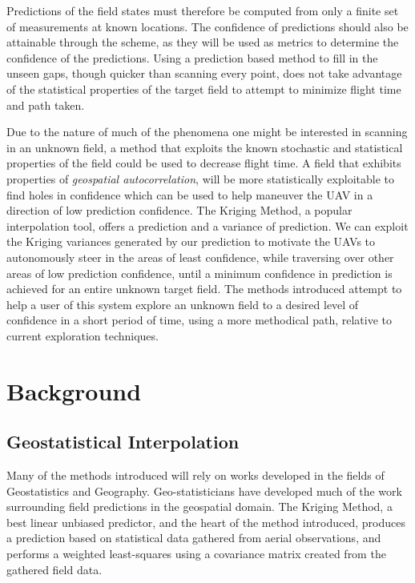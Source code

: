 \documentclass[11pt]{ucthesis}
\begin{document}
Predictions of the field states must therefore be computed from only a finite set of measurements at known locations. The confidence of predictions should also be attainable through the scheme, as they will be used as metrics to determine the confidence of the predictions. Using a prediction based method to fill in the unseen gaps, though quicker than scanning every point, does not take advantage of the statistical properties of the target field to attempt to minimize flight time and path taken. 

Due to the nature of much of the phenomena one might be interested in scanning in an unknown field, a method that exploits the known stochastic and statistical properties of the field could be used to decrease flight time. A field that exhibits properties of \textit{geospatial autocorrelation}, will be more statistically exploitable to find holes in confidence which can be used to help maneuver the UAV in a direction of low prediction confidence. The Kriging Method, a popular interpolation tool, offers a prediction and a variance of prediction. We can exploit the Kriging variances generated by our prediction to motivate the UAVs to autonomously steer in the areas of least confidence, while traversing over other areas of low prediction confidence, until a minimum confidence in prediction is achieved for an entire unknown target field. The methods introduced attempt to help a user of this system explore an unknown field to a desired level of confidence in a short period of time, using a more methodical path, relative to current exploration techniques. 

\part{Background}

\chapter{Geostatistical Interpolation}
Many of the methods introduced will rely on works developed in the fields of Geostatistics and Geography. Geo-statisticians have developed much of the work surrounding field predictions in the geospatial domain. The Kriging Method, a best linear unbiased predictor, and the heart of the method introduced, produces a prediction based on statistical data gathered from aerial observations, and performs a weighted least-squares using a covariance matrix created from the gathered field data.
\end{document}

